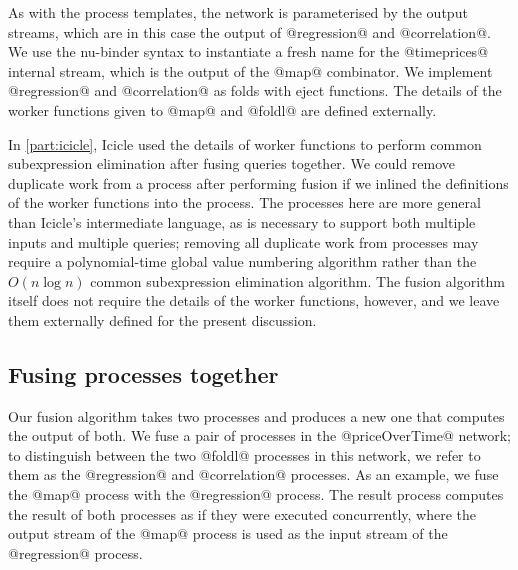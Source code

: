 As with the process templates, the network is parameterised by the output streams, which are in this case the output of @regression@ and @correlation@.
We use the nu-binder syntax to instantiate a fresh name for the @timeprices@ internal stream, which is the output of the @map@ combinator.
We implement @regression@ and @correlation@ as folds with eject functions.
The details of the worker functions given to @map@ and @foldl@ are defined externally.

In \cref{part:icicle}, Icicle used the details of worker functions to perform common subexpression elimination after fusing queries together.
We could remove duplicate work from a process after performing fusion if we inlined the definitions of the worker functions into the process.
The processes here are more general than Icicle's intermediate language, as is necessary to support both multiple inputs and multiple queries; removing all duplicate work from processes may require a polynomial-time global value numbering algorithm \citep{gulwani2004polynomial} rather than the $O(n \log n)$ common subexpression elimination algorithm.
The fusion algorithm itself does not require the details of the worker functions, however, and we leave them externally defined for the present discussion.

\subsection{Fusing processes together}
\label{s:FusingProcesses}

Our fusion algorithm takes two processes and produces a new one that computes the output of both.
We fuse a pair of processes in the @priceOverTime@ network; to distinguish between the two @foldl@ processes in this network, we refer to them as the @regression@ and @correlation@ processes.
As an example, we fuse the @map@ process with the @regression@ process.
The result process computes the result of both processes as if they were executed concurrently, where the output stream of the @map@ process is used as the input stream of the @regression@ process.

